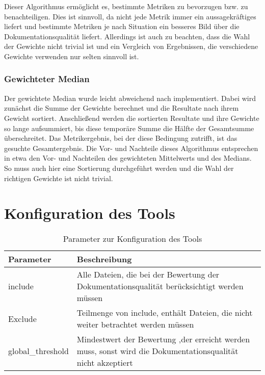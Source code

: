 Dieser Algorithmus ermöglicht es, bestimmte Metriken zu bevorzugen bzw. zu benachteiligen. Dies ist sinnvoll, da nicht jede Metrik immer ein aussagekräftiges liefert und bestimmte Metriken je nach Situation ein besseres Bild über die Dokumentationsqualität liefert. Allerdings ist auch zu beachten, dass die Wahl der Gewichte nicht trivial ist und ein Vergleich von Ergebnissen, die verschiedene Gewichte verwenden  nur selten sinnvoll ist. 

\subsubsection{Gewichteter Median}
Der gewichtete Median wurde leicht abweichend nach \cite[S. 37]{YAGER199835} implementiert. Dabei wird zunächst die Summe der Gewichte berechnet und die Resultate nach ihrem Gewicht sortiert. Anschließend werden die sortierten Resultate und ihre Gewichte so lange aufsummiert, bis diese temporäre Summe die Hälfte der Gesamtsumme überschreitet. Das Metrikergebnis, bei der diese Bedingung zutrifft, ist das gesuchte Gesamtergebnis. Die Vor- und Nachteile dieses Algorithmus entsprechen in etwa den Vor- und Nachteilen des gewichteten Mittelwerts und des Medians. So muss auch hier eine Sortierung durchgeführt werden und die Wahl der richtigen Gewichte ist nicht trivial. 
\section{Konfiguration des Tools}
\begin{table}[h]
    \centering
    \begin{tabular}{m{4cm}|m{11cm}}
    \hline
        Parameter & Beschreibung  \\
        \hline
        include & Alle Dateien, die bei der Bewertung der Dokumentationsqualität berücksichtigt werden müssen\\
        \hline
        Exclude & Teilmenge von include, enthält Dateien, die nicht weiter betrachtet werden müssen\\
        \hline
        global\_threshold & Mindestwert der Bewertung ,der erreicht werden muss, sonst wird die Dokumentationsqualität nicht akzeptiert
    \end{tabular}
    \caption{Parameter zur Konfiguration des Tools}
    \label{tab:tool_javadoc_conf}
\end{table}
